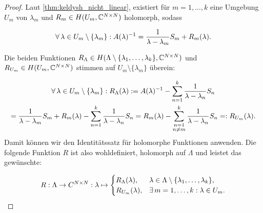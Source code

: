 \begin{proof}

    Laut \ref{thm:keldysh_nicht_linear}, existiert für $m = 1, \dots, k$ eine Umgebung $U_m$ von $\lambda_m$ und $R_m \in H(U_m, \mathbb{C}^{N \times N})$ holomorph, sodass

    \begin{align*}
        \forall \, \lambda \in U_m \setminus {\left \{ \lambda_m \right \}}:
            A(\lambda)^{-1}
            =
            \frac{1}{\lambda - \lambda_m} S_m
            +
            R_m(\lambda).
    \end{align*}

    Die beiden Funktionen $R_\Lambda \in H(\Lambda \setminus {\left \{ \lambda_1, \dots, \lambda_k \right \}}, \mathbb{C}^{N \times N})$ und $R_{U_m} \in H(U_m, \mathbb{C}^{N \times N})$ stimmen auf $U_m \setminus \{\lambda_m\}$ überein:

    \begin{multline*}
        \forall \, \lambda \in U_m \setminus {\left \{ \lambda_m \right \}}:
            R_\Lambda(\lambda)
            :=
            A(\lambda)^{-1}
            -
            \sum_{n=1}^k
                \frac{1}{\lambda - \lambda_n} S_n \\
            =
            \frac{1}{\lambda - \lambda_m} S_m
            +
            R_m(\lambda)
            -
            \sum_{n=1}^k
                \frac{1}{\lambda - \lambda_n} S_n
            =
            R_m(\lambda)
            -
            \sum_{\substack{n = 1 \\ n \neq m}}^k
                \frac{1}{\lambda - \lambda_n} S_n
            =:
            R_{U_m}(\lambda).
    \end{multline*}
    Damit können wir den Identitätssatz für holomorphe Funktionen anwenden.
    Die folgende Funktion $R$ ist also wohldefiniert, holomorph auf $\Lambda$ und leistet das gewünschte:

    \begin{align*}
        R:
        \Lambda \to C^{N \times N}:
        \lambda
        \mapsto
        \begin{cases}
            R_\Lambda(\lambda), & \lambda \in \Lambda \setminus {\left \{ \lambda_1, \dots, \lambda_k \right \}}, \\
            R_{U_m}(\lambda),   & \exists \, m = 1, \dots, k: \lambda \in U_m.
        \end{cases}
    \end{align*}

\end{proof}

